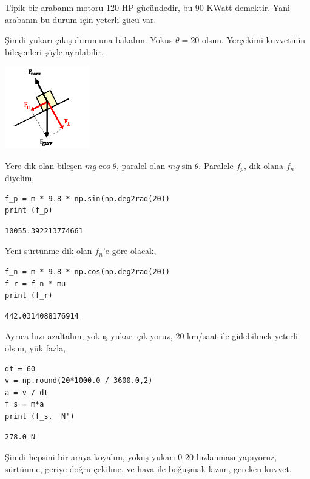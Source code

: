 \documentclass[12pt,fleqn]{article}\usepackage{../../common}
\begin{document}
Tipik bir arabanın motoru 120 HP gücündedir, bu 90 KWatt demektir. Yani arabanın
bu durum için yeterli gücü var.

Şimdi yukarı çıkış durumuna bakalım. Yokus $\theta = 20$ olsun. Yerçekimi
kuvvetinin bileşenleri şöyle ayrılabilir,

\includegraphics[width=10em]{phy_005_basics_08.png}

Yere dik olan bileşen $m g \cos\theta$, paralel olan $m g \sin\theta$. Paralele
$f_p$, dik olana $f_n$ diyelim,

\begin{verbatim}  
f_p = m * 9.8 * np.sin(np.deg2rad(20))
print (f_p)
\end{verbatim}

\begin{verbatim}
10055.392213774661
\end{verbatim}

Yeni sürtünme dik olan $f_n$'e göre olacak,

\begin{verbatim}
f_n = m * 9.8 * np.cos(np.deg2rad(20))
f_r = f_n * mu
print (f_r)
\end{verbatim}

\begin{verbatim}
442.0314088176914
\end{verbatim}

Ayrıca hızı azaltalım, yokuş yukarı çıkıyoruz, 20 km/saat ile gidebilmek yeterli
olsun, yük fazla,

\begin{verbatim}
dt = 60
v = np.round(20*1000.0 / 3600.0,2)
a = v / dt
f_s = m*a
print (f_s, 'N')
\end{verbatim}

\begin{verbatim}
278.0 N
\end{verbatim}

Şimdi hepsini bir araya koyalım, yokuş yukarı 0-20 hızlanması yapıyoruz,
sürtünme, geriye doğru çekilme, ve hava ile boğuşmak lazım, gereken kuvvet,
\end{document}
